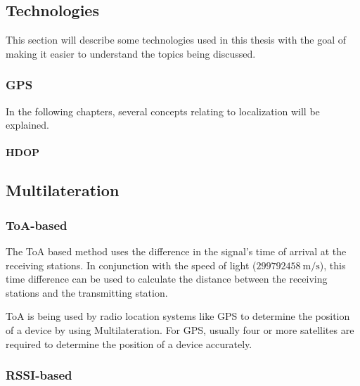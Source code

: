 \subsection{Technologies}

This section will describe some technologies used in this thesis with the goal of making it easier to understand the topics being discussed.

\subsubsection{\ac{GPS}}


In the following chapters, several concepts relating to localization will be explained.

\paragraph{\ac{HDOP}}


\subsection{Multilateration}


\subsubsection{\acs{ToA}-based}\label{sec:toa-based-multilateration}

The \acf{ToA} based method uses the difference in the signal's time of arrival at the receiving stations.
In conjunction with the speed of light ($299792458\ \mathrm{m/s}$), this time difference can be used to calculate the distance between the receiving stations and the transmitting station.

\ac{ToA} is being used by radio location systems like \ac{GPS} to determine the position of a device by using Multilateration.
For GPS, usually four or more satellites are required to determine the position of a device accurately.


\subsubsection{\acs{RSSI}-based}\label{sec:rssi-based-multilateration}

